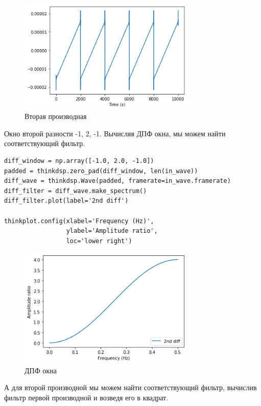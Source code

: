 \documentclass[a4paper,12pt]{report}
\begin{document}
\begin{figure}[H]
        \centering
        \includegraphics[width=0.75\textwidth]{lab9_fig5_4.png}
        \caption{Вторая производная}
        \label{fig:lab9_fig5_4}
\end{figure}

Окно второй разности -1, 2, -1. Вычисляя ДПФ окна, мы можем найти соответствующий фильтр.

\begin{lstlisting}[caption=ДПФ окна]
diff_window = np.array([-1.0, 2.0, -1.0])
padded = thinkdsp.zero_pad(diff_window, len(in_wave))
diff_wave = thinkdsp.Wave(padded, framerate=in_wave.framerate)
diff_filter = diff_wave.make_spectrum()
diff_filter.plot(label='2nd diff')

thinkplot.config(xlabel='Frequency (Hz)',
                 ylabel='Amplitude ratio',
                 loc='lower right')
\end{lstlisting}

\begin{figure}[H]
        \centering
        \includegraphics[width=0.75\textwidth]{lab9_fig5_5.png}
        \caption{ДПФ окна}
        \label{fig:lab9_fig5_5}
\end{figure}

А для второй производной мы можем найти соответствующий фильтр, вычислив фильтр первой производной и возведя его в квадрат.
\end{document}
